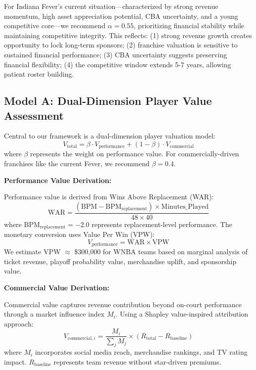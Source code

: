 \documentclass{mcmthesis}
\begin{document}
For Indiana Fever's current situation---characterized by strong revenue momentum, high asset appreciation potential, CBA uncertainty, and a young competitive core---we recommend $\alpha = 0.55$, prioritizing financial stability while maintaining competitive integrity. This reflects: (1) strong revenue growth creates opportunity to lock long-term sponsors; (2) franchise valuation is sensitive to sustained financial performance; (3) CBA uncertainty suggests preserving financial flexibility; (4) the competitive window extends 5-7 years, allowing patient roster building.

\subsection{Model A: Dual-Dimension Player Value Assessment}

Central to our framework is a dual-dimension player valuation model:
\begin{equation}
V_{\text{total}} = \beta \cdot V_{\text{performance}} + (1-\beta) \cdot V_{\text{commercial}}
\end{equation}
where $\beta$ represents the weight on performance value. For commercially-driven franchises like the current Fever, we recommend $\beta = 0.4$.

\textbf{Performance Value Derivation:}

Performance value is derived from Wins Above Replacement (WAR):
\begin{equation}
\text{WAR} = \frac{(\text{BPM} - \text{BPM}_{\text{replacement}}) \times \text{Minutes\_Played}}{48 \times 40}
\end{equation}
where $\text{BPM}_{\text{replacement}} = -2.0$ represents replacement-level performance. The monetary conversion uses Value Per Win (VPW):
\begin{equation}
V_{\text{performance}} = \text{WAR} \times \text{VPW}
\end{equation}
We estimate VPW $\approx$ \$300,000 for WNBA teams based on marginal analysis of ticket revenue, playoff probability value, merchandise uplift, and sponsorship value.

\textbf{Commercial Value Derivation:}

Commercial value captures revenue contribution beyond on-court performance through a market influence index $M_i$. Using a Shapley value-inspired attribution approach:
\begin{equation}
V_{\text{commercial},i} = \frac{M_i}{\sum_j M_j} \times (R_{\text{total}} - R_{\text{baseline}})
\end{equation}
where $M_i$ incorporates social media reach, merchandise rankings, and TV rating impact. $R_{\text{baseline}}$ represents team revenue without star-driven premiums.
\end{document}
